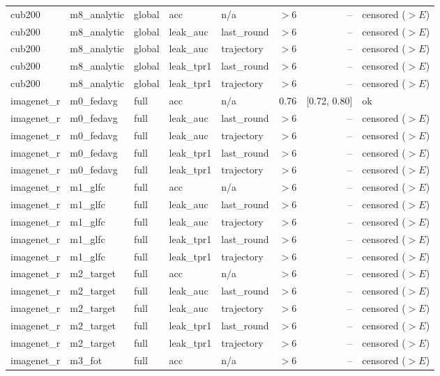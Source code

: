 \begin{tabular}{lllllrrl}
cub200 & m8\_analytic & global & acc & n/a & $>$6 & -- & censored ($>E$) \\
cub200 & m8\_analytic & global & leak\_auc & last\_round & $>$6 & -- & censored ($>E$) \\
cub200 & m8\_analytic & global & leak\_auc & trajectory & $>$6 & -- & censored ($>E$) \\
cub200 & m8\_analytic & global & leak\_tpr1 & last\_round & $>$6 & -- & censored ($>E$) \\
cub200 & m8\_analytic & global & leak\_tpr1 & trajectory & $>$6 & -- & censored ($>E$) \\
imagenet\_r & m0\_fedavg & full & acc & n/a & 0.76 & [0.72, 0.80] & ok \\
imagenet\_r & m0\_fedavg & full & leak\_auc & last\_round & $>$6 & -- & censored ($>E$) \\
imagenet\_r & m0\_fedavg & full & leak\_auc & trajectory & $>$6 & -- & censored ($>E$) \\
imagenet\_r & m0\_fedavg & full & leak\_tpr1 & last\_round & $>$6 & -- & censored ($>E$) \\
imagenet\_r & m0\_fedavg & full & leak\_tpr1 & trajectory & $>$6 & -- & censored ($>E$) \\
imagenet\_r & m1\_glfc & full & acc & n/a & $>$6 & -- & censored ($>E$) \\
imagenet\_r & m1\_glfc & full & leak\_auc & last\_round & $>$6 & -- & censored ($>E$) \\
imagenet\_r & m1\_glfc & full & leak\_auc & trajectory & $>$6 & -- & censored ($>E$) \\
imagenet\_r & m1\_glfc & full & leak\_tpr1 & last\_round & $>$6 & -- & censored ($>E$) \\
imagenet\_r & m1\_glfc & full & leak\_tpr1 & trajectory & $>$6 & -- & censored ($>E$) \\
imagenet\_r & m2\_target & full & acc & n/a & $>$6 & -- & censored ($>E$) \\
imagenet\_r & m2\_target & full & leak\_auc & last\_round & $>$6 & -- & censored ($>E$) \\
imagenet\_r & m2\_target & full & leak\_auc & trajectory & $>$6 & -- & censored ($>E$) \\
imagenet\_r & m2\_target & full & leak\_tpr1 & last\_round & $>$6 & -- & censored ($>E$) \\
imagenet\_r & m2\_target & full & leak\_tpr1 & trajectory & $>$6 & -- & censored ($>E$) \\
imagenet\_r & m3\_fot & full & acc & n/a & $>$6 & -- & censored ($>E$) \\

\end{tabular}

